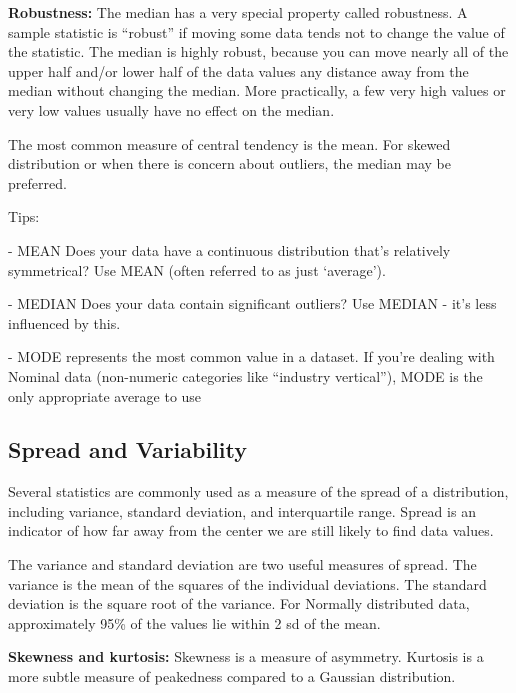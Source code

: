 \documentclass[openany]{book}
\begin{document}
\textbf{Robustness:} The median has a very special property called robustness. A sample statistic is “robust” if moving some data tends not to change the value of the statistic. The median is highly robust, because you can move nearly all of the upper half and/or lower half of the data values any distance away from the median without changing the median. More practically, a few very high values or very low values usually have no effect on the median.


The most common measure of central tendency is the mean. For skewed distribution or when there is concern about outliers, the median may be preferred.

Tips:

- MEAN Does your data have a continuous distribution that’s relatively symmetrical? Use MEAN (often referred to as just ‘average’).

- MEDIAN Does your data contain significant outliers? Use MEDIAN - it's less influenced by this.

- MODE represents the most common value in a dataset. If you’re dealing with Nominal data (non-numeric categories like “industry vertical”), MODE is the only appropriate average to use

\subsection{Spread and Variability} 


Several statistics are commonly used as a measure of the spread of a distribution, including variance, standard deviation, and interquartile range. Spread is an indicator of how far away from the center we are still likely to find data values.

The variance and standard deviation are two useful measures of spread. The variance is the mean of the squares of the individual deviations. The standard deviation is the square root of the variance. For Normally distributed data, approximately 95\% of the values lie within 2 sd of the mean.

\textbf{Skewness and kurtosis:} Skewness is a measure of asymmetry. Kurtosis is a more subtle measure of peakedness compared to a Gaussian distribution.
\end{document}
